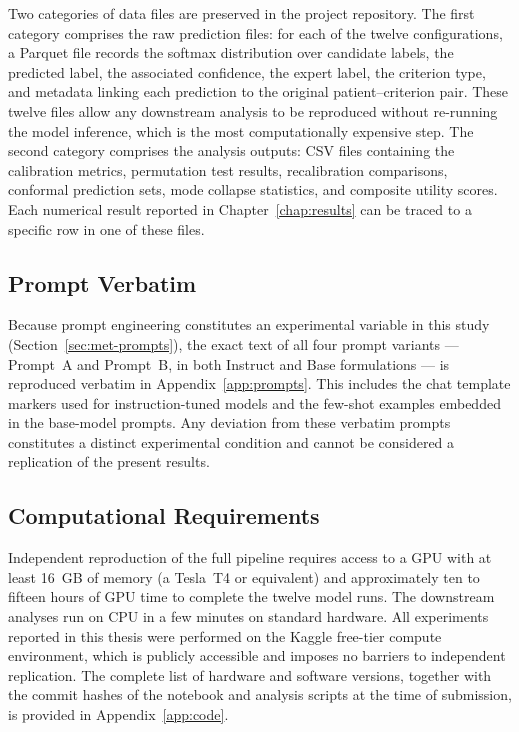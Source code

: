 Two categories of data files are preserved in the project repository. 
The first category comprises the raw prediction files: for each of the 
twelve configurations, a Parquet file records the softmax distribution 
over candidate labels, the predicted label, the associated confidence, 
the expert label, the criterion type, and metadata linking each 
prediction to the original patient--criterion pair. These twelve files 
allow any downstream analysis to be reproduced without re-running the 
model inference, which is the most computationally expensive step. The 
second category comprises the analysis outputs: CSV files containing the 
calibration metrics, permutation test results, recalibration comparisons, 
conformal prediction sets, mode collapse statistics, and composite 
utility scores. Each numerical result reported in 
Chapter~\ref{chap:results} can be traced to a specific row in one of 
these files.

\subsection{Prompt Verbatim}
\label{subsec:met-repro-prompts}

Because prompt engineering constitutes an experimental variable in this 
study (Section~\ref{sec:met-prompts}), the exact text of all four prompt 
variants --- Prompt~A and Prompt~B, in both Instruct and Base 
formulations --- is reproduced verbatim in Appendix~\ref{app:prompts}. 
This includes the chat template markers used for instruction-tuned 
models and the few-shot examples embedded in the base-model prompts. 
Any deviation from these verbatim prompts constitutes a distinct 
experimental condition and cannot be considered a replication of the 
present results.

\subsection{Computational Requirements}
\label{subsec:met-repro-compute}

Independent reproduction of the full pipeline requires access to a GPU 
with at least 16~GB of memory (a Tesla~T4 or equivalent) and 
approximately ten to fifteen hours of GPU time to complete the twelve 
model runs. The downstream analyses run on CPU in a few minutes on 
standard hardware. All experiments reported in this thesis were 
performed on the Kaggle free-tier compute environment, which is 
publicly accessible and imposes no barriers to independent replication. 
The complete list of hardware and software versions, together with the 
commit hashes of the notebook and analysis scripts at the time of 
submission, is provided in Appendix~\ref{app:code}.

